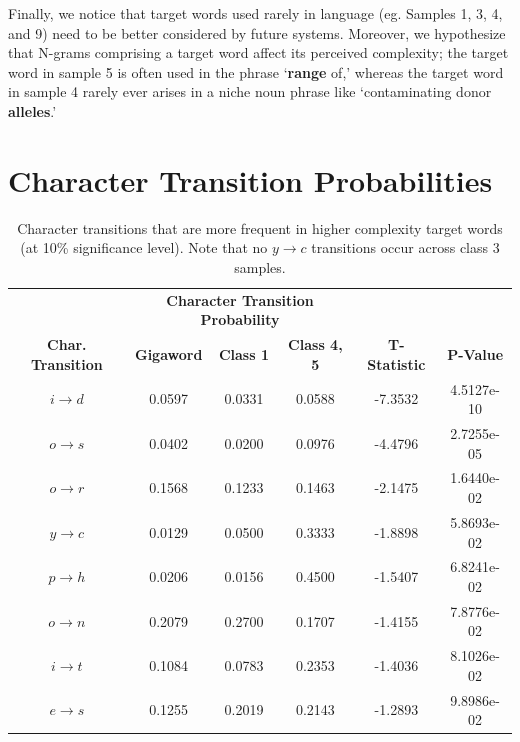 \documentclass{dcthesis}
\theoremstyle{definition}
\theoremstyle{remark}
\begin{document}
Finally, we notice that target words used rarely in language (eg. Samples 1, 3, 4, and 9) need to be better considered by future systems. Moreover, we hypothesize that N-grams comprising a target word affect its perceived complexity; the target word in sample 5 is often used in the phrase \lq{\textbf{range} of,}\rq{} whereas the target word in sample 4 rarely ever arises in a niche noun phrase like \lq{contaminating donor \textbf{alleles}.}\rq{} 

\section{Character Transition Probabilities}

\begin{table}
  \centering
  \begin{tabular}{c|ccc|cc}
    \hline
    \centering
    & \multicolumn{3}{c|}{\textbf{Character Transition Probability}} &  &  \\
    \textbf{Char. Transition} & \textbf{Gigaword} & \textbf{Class 1} & \textbf{Class 4, 5} & \textbf{T-Statistic} & \textbf{P-Value}  \\
    \hline
    $i \rightarrow d$ & 0.0597 & 0.0331 &  0.0588 &    -7.3532 &  4.5127e-10 \\
    $o \rightarrow s$ & 0.0402 & 0.0200 &  0.0976 &    -4.4796 &  2.7255e-05 \\
    $o \rightarrow r$ & 0.1568 & 0.1233 &  0.1463 &    -2.1475 &  1.6440e-02 \\
    $y \rightarrow c$ & 0.0129 & 0.0500 &  0.3333 &    -1.8898 &  5.8693e-02 \\
    $p \rightarrow h$ & 0.0206 & 0.0156 &  0.4500 &    -1.5407 &  6.8241e-02 \\
    $o \rightarrow n$ & 0.2079 & 0.2700 &  0.1707 &    -1.4155 &  7.8776e-02 \\
    $i \rightarrow t$ & 0.1084 & 0.0783 &  0.2353 &    -1.4036 &  8.1026e-02 \\
    $e \rightarrow s$ & 0.1255 & 0.2019 &  0.2143 &    -1.2893 &  9.8986e-02 \\
    \hline
  \end{tabular}
  \caption{\label{tab:top_char_transitions} Character transitions that are more frequent in higher complexity target words (at 10\% significance level). Note that no $y \rightarrow c$ transitions occur across class 3 samples.}
\end{table}
\end{document}
